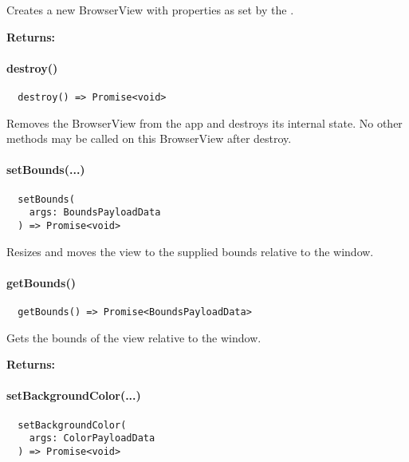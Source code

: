 Creates a new BrowserView with properties as set by the .

\textbf{Returns:} 



\paragraph{destroy()}

\begin{verbatim}
  destroy() => Promise<void>
\end{verbatim}

Removes the BrowserView from the app and destroys its internal state.
No other methods may be called on this BrowserView after destroy.



\paragraph{setBounds(...)}

\begin{verbatim}
  setBounds(
    args: BoundsPayloadData
  ) => Promise<void>
\end{verbatim}

Resizes and moves the view to the supplied bounds relative to the window.



\paragraph{getBounds()}

\begin{verbatim}
  getBounds() => Promise<BoundsPayloadData>
\end{verbatim}

Gets the bounds of the view relative to the window.

\textbf{Returns:} 



\paragraph{setBackgroundColor(...)}

\begin{verbatim}
  setBackgroundColor(
    args: ColorPayloadData
  ) => Promise<void>
\end{verbatim}

